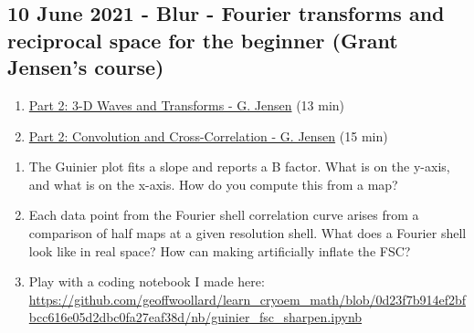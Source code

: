 \documentclass[11pt, oneside]{article}   	%
\begin{document}
\subsection{10 June 2021 - Blur - Fourier transforms and reciprocal space for the beginner (Grant Jensen's course)}
\begin{enumerate}
	\item \href{https://youtu.be/INtehLmqfmA}{Part 2: 3-D Waves and Transforms - G. Jensen} (13 min)
	\item \href{https://youtu.be/MQm6ZP1F6ms}{Part 2: Convolution and Cross-Correlation - G. Jensen} (15 min)
	\end{enumerate}
\begin{enumerate}
	\item The Guinier plot fits a slope and reports a B factor. What is on the y-axis, and what is on the x-axis. How do you compute this from a map? 
	\item Each data point from the Fourier shell correlation curve arises from a comparison of half maps at a given resolution shell. What does a Fourier shell look like in real space? How can making artificially inflate the FSC?
	\item Play with a coding notebook I made here: \url{https://github.com/geoffwoollard/learn_cryoem_math/blob/0d23f7b914ef2bfbcc616e05d2dbc0fa27eaf38d/nb/guinier_fsc_sharpen.ipynb}
\end{enumerate}
\end{document}
